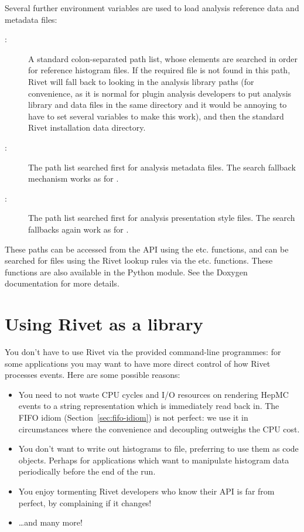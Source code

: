 Several further environment variables are used to load analysis reference data
and metadata files:
\begin{description}
\item[:] A standard colon-separated path list, whose
  elements are searched in order for reference histogram files. If the required
  file is not found in this path, Rivet will fall back to looking in the
  analysis library paths (for convenience, as it is normal for plugin analysis
  developers to put analysis library and data files in the same directory and it
  would be annoying to have to set several variables to make this work), and
  then the standard Rivet installation data directory.
\item[:] The path list searched first for analysis
   metadata files. The search fallback mechanism works as for
  .
\item[:] The path list searched first for analysis
   presentation style files. The search fallbacks again work as for
  .
\end{description}

These paths can be accessed from the API using the
 etc. functions, and can be searched for files
using the Rivet lookup rules via the 
etc. functions. These functions are also available in the Python 
module. See the Doxygen documentation for more details.



\section{Using Rivet as a library}

You don't have to use Rivet via the provided command-line programmes: for some
applications you may want to have more direct control of how Rivet processes
events. Here are some possible reasons:
%
\begin{itemize}
\item You need to not waste CPU cycles and I/O resources on rendering HepMC
  events to a string representation which is immediately read back in. The FIFO
  idiom (Section~\ref{sec:fifo-idiom}) is not perfect: we use it in circumstances
  where the convenience and decoupling outweighs the CPU cost.
\item You don't want to write out histograms to file, preferring to use them as
  code objects. Perhaps for applications which want to manipulate histogram data
  periodically before the end of the run.
\item You enjoy tormenting Rivet developers who know their API is far from
  perfect, by complaining if it changes!
\item \dots and many more!
\end{itemize}

